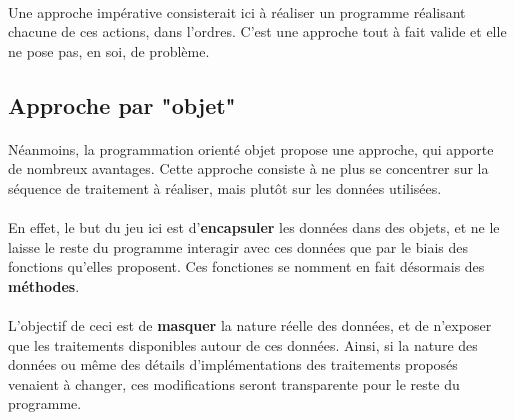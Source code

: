 {  \bizProcessExemple

  \paragraph{} Une approche impérative consisterait ici à réaliser un programme réalisant chacune de
  ces actions, dans l'ordres. C'est une approche tout à fait valide et elle ne pose pas, en soi, de
  problème.

  \subsection{Approche par "objet"}

  \paragraph{} Néanmoins, la programmation orienté objet propose une approche, qui apporte de nombreux
  avantages. Cette approche consiste à ne plus se concentrer sur la séquence de traitement à réaliser,
  mais plutôt sur les données utilisées.

  \paragraph{} En effet, le but du jeu ici est d'\textbf{encapsuler} les données dans des objets, et
  ne le laisse le reste du programme interagir avec ces données que par le biais des fonctions
  qu'elles proposent. Ces fonctiones se nomment en fait désormais des \textbf{méthodes}.

  \paragraph{} L'objectif de ceci est de \textbf{masquer} la nature réelle des données, et de
  n'exposer que les traitements disponibles autour de ces données. Ainsi, si la nature des données ou
  même des détails d'implémentations des traitements proposés venaient à changer, ces modifications
  seront transparente pour le reste du programme.
}


